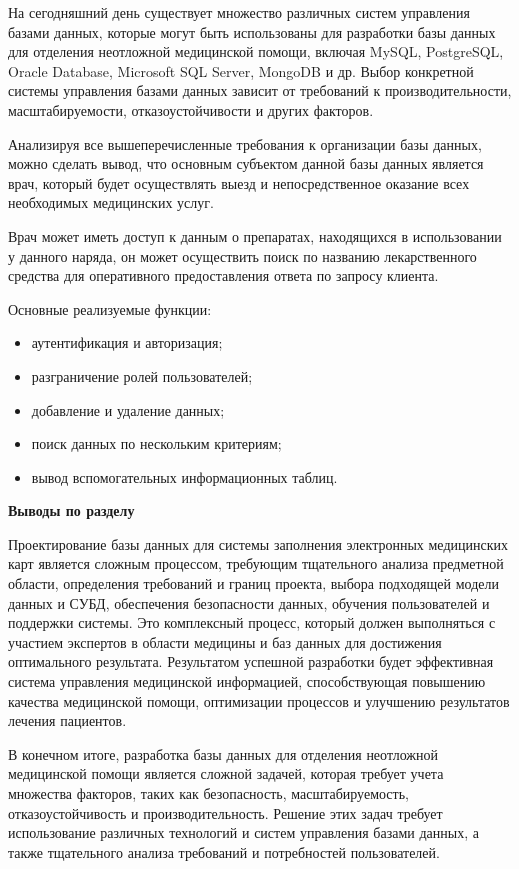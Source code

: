 На сегодняшний день существует множество различных систем управления базами данных, которые могут быть использованы для разработки базы данных для отделения неотложной медицинской помощи, включая MySQL, PostgreSQL, Oracle Database, Microsoft SQL Server, MongoDB и др. Выбор конкретной системы управления базами данных зависит от требований к производительности, масштабируемости, отказоустойчивости и других факторов.

Анализируя все вышеперечисленные требования к организации базы данных, можно сделать вывод, что основным субъектом данной базы данных является врач, который будет осуществлять выезд и непосредственное оказание всех необходимых медицинских услуг.

Врач может иметь доступ к данным о препаратах, находящихся в использовании у данного наряда, он может осуществить поиск по названию лекарственного средства для оперативного предоставления ответа по запросу клиента.

Основные реализуемые функции:
\begin{itemize}
    \item аутентификация и авторизация;
    \item разграничение ролей пользователей;
    \item добавление и удаление данных;
    \item поиск данных по нескольким критериям;
    \item вывод вспомогательных информационных таблиц.
\end{itemize}

\bigbreak
\textbf{Выводы по разделу}
\bigbreak

Проектирование базы данных для системы заполнения электронных медицинских карт является сложным процессом, требующим тщательного анализа предметной области, определения требований и границ проекта, выбора подходящей модели данных и СУБД, обеспечения безопасности данных, обучения пользователей и поддержки системы. Это комплексный процесс, который должен выполняться с участием экспертов в области медицины и баз данных для достижения оптимального результата. Результатом успешной разработки будет эффективная система управления медицинской информацией, способствующая повышению качества медицинской помощи, оптимизации процессов и улучшению результатов лечения пациентов.

В конечном итоге, разработка базы данных для отделения неотложной медицинской помощи является сложной задачей, которая требует учета множества факторов, таких как безопасность, масштабируемость, отказоустойчивость и производительность. Решение этих задач требует использование различных технологий и систем управления базами данных, а также тщательного анализа требований и потребностей пользователей.